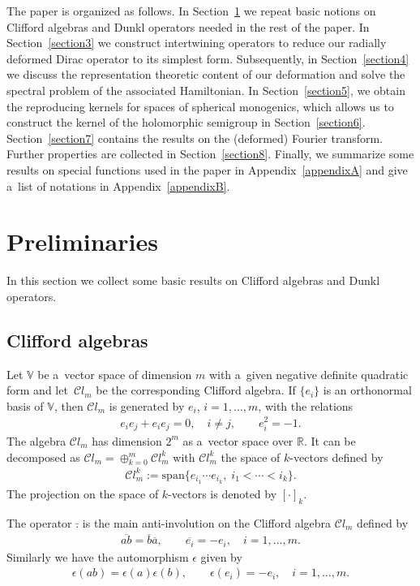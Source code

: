 \documentclass[pdftex]{sigma}
\numberwithin{equation}{section}
\numberwithin{theorem}{section}
\numberwithin{proposition}{section}
\numberwithin{lemma}{section}
\numberwithin{corollary}{section}
\numberwithin{definition}{section}
\numberwithin{example}{section}
\numberwithin{remark}{section}
\numberwithin{note}{section}
\theoremstyle{remark}
\newcommand{\mR}{\mathbb{R}}
\newcommand{\mV}{\mathbb{V}}
\newcommand{\cC}{\mathcal{C}}
\begin{document}
The paper is organized as follows.
In Section~\ref{section2} we repeat basic notions on Clif\/ford algebras and Dunkl operators needed
in the rest of the paper.
In Section~\ref{section3} we construct intertwining operators to reduce our radially deformed Dirac
operator to its simplest form.
Subsequently, in Section~\ref{section4} we discuss the representation theoretic content of our
deformation and solve the spectral problem of the associated Hamiltonian.
In Section~\ref{section5}, we obtain the reproducing kernels for spaces of spherical monogenics,
which allows us to construct the kernel of the holomorphic semigroup in Section~\ref{section6}.
Section~\ref{section7} contains the results on the (deformed) Fourier transform.
Further properties are collected in Section~\ref{section8}.
Finally, we summarize some results on special functions used in the paper in
Appendix~\ref{appendixA} and give a~list of notations in Appendix~\ref{appendixB}.

\section{Preliminaries}\label{section2}

In this section we collect some basic results on Clif\/ford algebras and Dunkl operators.

\subsection{Clif\/ford algebras}\label{section2.1}
Let $\mV$ be a~vector space of dimension $m$ with a~given negative def\/inite quadratic form and
let~$\cC l_{m}$ be the corresponding Clif\/ford algebra.
If $\{e_i\}$ is an orthonormal basis of $\mV$, then $\cC l_{m}$ is generated by $e_{i}$, $i=1,
\ldots,m$, with the relations
\begin{gather*} %
e_{i} e_{j} + e_{i} e_{j} = 0, \quad i \neq j,\qquad
 e_{i}^{2} = -1.
\end{gather*}
The algebra $\cC l_{m}$ has dimension $2^{m}$ as a~vector space over $\mR$.
It can be decomposed as $\cC l_{m}=\oplus_{k=0}^{m}\cC l_{m}^{k}$
with $\cC l_{m}^{k}$ the space of $k$-vectors def\/ined by
\begin{gather*}
\cC l_{m}^{k}:=\text{span}\{e_{i_{1}}\cdots e_{i_{k}},\; i_{1}<\cdots<i_{k}\}.
\end{gather*}
The projection on the space of $k$-vectors is denoted by $[\cdot]_{k}$.

The operator $\bar{.}$ is the main anti-involution on the Clif\/ford algebra $\cC l_{m}$ def\/ined by
\begin{gather*}
\overline{a b}=\overline{b}\overline{a},\qquad\overline{e_{i}}=-e_{i},\quad i=1,\ldots,m.
\end{gather*}
Similarly we have the automorphism $\epsilon$ given by
\begin{gather*}
\epsilon(a b)=\epsilon(a)\epsilon(b),\qquad\epsilon(e_{i})=-e_{i},\quad i=1,\ldots,m.
\end{gather*}
\end{document}
